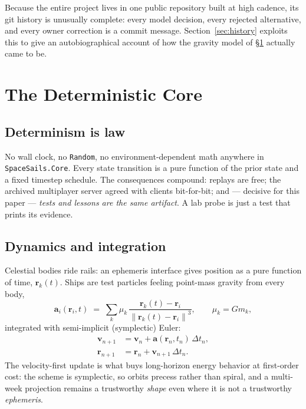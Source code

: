 \documentclass[10pt,twocolumn]{article}
\newcommand{\dt}{\Delta t}
\newcommand{\norm}[1]{\left\lVert #1 \right\rVert}
\newcommand{\vect}[1]{\mathbf{#1}}
\begin{document}
Because the entire project lives in one public repository built at high cadence, its git
history is unusually complete: every model decision, every rejected alternative, and every
owner correction is a commit message. Section~\ref{sec:history} exploits this to give an
autobiographical account of how the gravity model of \S\ref{sec:core} actually came to be.

\section{The Deterministic Core}
\label{sec:core}

\subsection{Determinism is law}

No wall clock, no \texttt{Random}, no environment-dependent math anywhere in
\texttt{SpaceSails.Core}. Every state transition is a pure function of the prior state and
a fixed timestep schedule. The consequences compound: replays are free; the archived
multiplayer server agreed with clients bit-for-bit; and --- decisive for this paper ---
\emph{tests and lessons are the same artifact}. A lab probe is just a test that prints its
evidence.

\subsection{Dynamics and integration}

Celestial bodies ride rails: an ephemeris interface gives position as a pure function of
time, $\vect{r}_k(t)$. Ships are test particles feeling point-mass gravity from every body,
\begin{equation}
\vect{a}_i(\vect{r}_i, t) \;=\; \sum_{k}
  \mu_k \,\frac{\vect{r}_k(t) - \vect{r}_i}
              {\norm{\vect{r}_k(t) - \vect{r}_i}^{3}},
\qquad \mu_k = G m_k ,
\label{eq:gravity}
\end{equation}
integrated with semi-implicit (symplectic) Euler:
\begin{equation}
\begin{aligned}
\vect{v}_{n+1} &= \vect{v}_n + \vect{a}(\vect{r}_n, t_n)\,\dt_n ,\\
\vect{r}_{n+1} &= \vect{r}_n + \vect{v}_{n+1}\,\dt_n .
\end{aligned}
\label{eq:symplectic}
\end{equation}
The velocity-first update is what buys long-horizon energy behavior at first-order cost:
the scheme is symplectic, so orbits precess rather than spiral, and a multi-week projection
remains a trustworthy \emph{shape} even where it is not a trustworthy \emph{ephemeris}.
\end{document}
